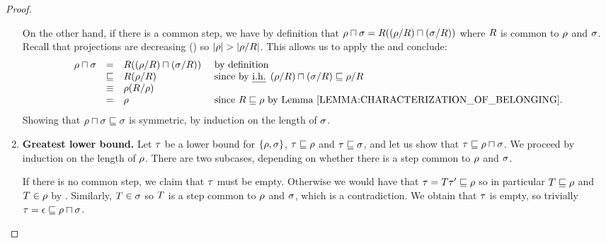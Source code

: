\begin{proof}
\begin{enumerate}
  On the other hand, if there is a common step, we have by definition that
  $\rho \sqcap \sigma = R((\rho/R) \sqcap (\sigma/R))$
  where $R$ is common to $\rho$ and $\sigma$.
  Recall that projections are decreasing ()
  so $|\rho| > |\rho/R|$.
  This allows us to apply the \ih and conclude:
  \[
  \begin{array}{rcll}
    \redseq \sqcap \redseqtwo & =       & \redex((\redseq/\redex) \sqcap (\redseqtwo/\redex)) & \text{ by definition} \\
                              & \permle & \redex(\redseq/\redex)   & \text{ since by \ih $(\redseq/\redex) \sqcap (\redseqtwo/\redex) \permle \redseq/\redex$} \\
                              & \permeq & \redseq(\redex/\redseq)  \\
                              & =       & \redseq                  & \text{ since $\redex \permle \redseq$ by \rlem{characterization_of_belonging}.} \\
  \end{array}
  \]
  Showing that $\rho \sqcap \sigma \sqsubseteq \sigma$ is symmetric,
  by induction on the length of $\sigma$.
\item {\bf Greatest lower bound.}
  Let $\tau$ be a lower bound for $\{\rho, \sigma\}$,
  \ie $\tau \sqsubseteq \rho$ and $\tau \sqsubseteq \sigma$,
  and let us show that $\tau \sqsubseteq \rho \sqcap \sigma$.
  We proceed by induction on the length of $\rho$.
  There are two subcases, depending on whether
  there is a step common to $\rho$ and $\sigma$.

  If there is no common step,
  we claim that $\tau$ must be empty.
  Otherwise we would have that $\tau = T\tau' \sqsubseteq \rho$
  so in particular $T \sqsubseteq \rho$ and $T \in \rho$ by .
  Similarly, $T \in \sigma$ so
  $T$ is a step common to $\rho$ and $\sigma$,
  which is a contradiction.
  We obtain that $\tau$ is empty,
  so trivially $\tau = \epsilon \sqsubseteq \rho \sqcap \sigma$.


\end{enumerate}
\end{proof}
